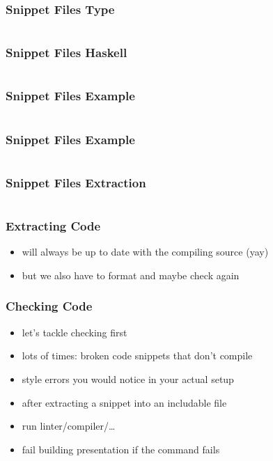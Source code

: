 \documentclass{beamer}
\begin{document}
\begin{frame}
  \frametitle{Snippet Files \textemdash{} Type}
  \begin{center}
    \inputminted{text}{snippets/snippet-type.dhall}
  \end{center}
\end{frame}

\begin{frame}
  \frametitle{Snippet Files \textemdash{} Haskell}
  \inputminted{haskell}{snippets/haskell-snippet-type.hs}
\end{frame}

\begin{frame}
  \frametitle{Snippet Files \textemdash{} Example}
  \begin{center}
    \inputminted{text}{snippets/snippet-type.snippet}
  \end{center}
\end{frame}

\begin{frame}
  \frametitle{Snippet Files \textemdash{} Example}
  \begin{center}
    \inputminted{text}{snippets/pdf-rule.snippet}
  \end{center}
\end{frame}

\begin{frame}
  \frametitle{Snippet Files \textemdash{} Extraction}
  \inputminted{haskell}{snippets/extraction.hs}
\end{frame}

\begin{frame}
  \frametitle{Extracting Code}
  \begin{itemize}
  \item will always be up to date with the compiling source (yay)
  \item but we also have to format and maybe check again
  \end{itemize}
\end{frame}

\begin{frame}
  \frametitle{Checking Code}
  \begin{itemize}
  \item let's tackle checking first
  \item lots of times: broken code snippets that don't compile
  \item style errors you would notice in your actual setup
  \item after extracting a snippet into an includable file
  \item run linter/compiler/\ldots
  \item fail building presentation if the command fails
  \end{itemize}
\end{frame}
\end{document}
